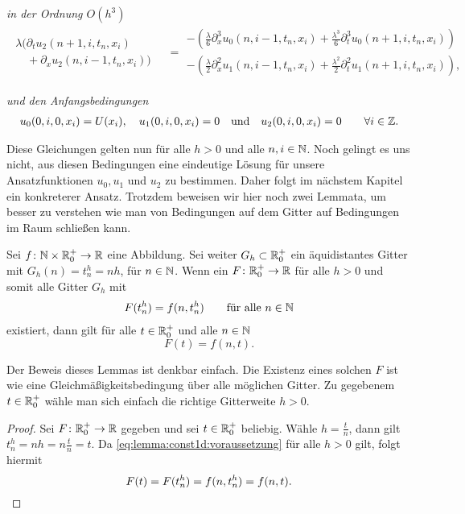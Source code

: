 \noindent \emph{in der Ordnung $O(h^3)$}
\begin{align}\label{eq:transport:diskret:oh3}
\begin{split}
\lambda \bigl(\partial_t u_2(n+1, i, t_n, x_i)\qquad\\
\quad + \partial_x u_2(n, i-1, t_n, x_i) \bigr)
\end{split}
&= \begin{split}
- \left(\frac {\lambda}{6} \partial^3_x u_0(n, i-1, t_n, x_i) + \frac{\lambda^3}{6} \partial^3_t u_0(n+1, i, t_n, x_i)\right)\\
- \left(\frac {\lambda}{2} \partial^2_x u_1(n, i-1, t_n, x_i) + \frac{\lambda^2}{2} \partial^2_t u_1(n+1, i, t_n, x_i)\right),
\end{split}
\end{align}

\vspace{0.4cm}
\noindent \emph{und den Anfangsbedingungen}
\begin{align}\label{eq:transport:diskret:anfangsbedinungen}
u_0(0, i, 0, x_i) = U(x_i), \quad u_1(0, i, 0, x_i) = 0 \quad \text{und} \quad u_2(0, i, 0, x_i) = 0 \qquad \forall i \in \mathbb Z.
\end{align}

Diese Gleichungen gelten nun für alle $h > 0$ und alle $n, i \in \mathbb N$.
Noch gelingt es uns nicht, aus diesen Bedingungen eine eindeutige Lösung für unsere Ansatzfunktionen $u_0, u_1$ und $u_2$ zu bestimmen.
Daher folgt im nächstem Kapitel ein konkreterer Ansatz.
Trotzdem beweisen wir hier noch zwei Lemmata, um besser zu verstehen wie man von Bedingungen auf dem Gitter auf Bedingungen im Raum schließen kann.
\\

\begin{lemma} \label{lemma:transport:diskret:konstant1}
Sei $f\colon \mathbb N \times \mathbb R^+_0 \to \mathbb R$ eine Abbildung.
Sei weiter $G_h \subset \mathbb R^+_0$ ein äquidistantes Gitter mit $G_h(n) = t^h_n = n h$, für $n \in \mathbb N$.
Wenn ein $F\colon \mathbb R^+_0 \to \mathbb R$ für alle $h > 0$ und somit alle Gitter $G_h$ mit
\begin{align}\label{eq:lemma:const1d:voraussetzung}
F(t^h_n) = f(n, t^h_n) \qquad \text{für alle $n \in \mathbb N$}
\end{align}
existiert, dann gilt für alle $t \in \mathbb R^+_0$ und alle $n \in \mathbb N$
\[ F(t) = f(n, t). \]
\end{lemma}
Der Beweis dieses Lemmas ist denkbar einfach. Die Existenz eines solchen $F$ ist wie eine Gleichmäßigkeitsbedingung über alle möglichen Gitter.
Zu gegebenem $t \in \mathbb R^+_0$ wähle man sich einfach die richtige Gitterweite $h > 0$.
\begin{proof}
Sei $F\colon \mathbb R^+_0 \to \mathbb R$ gegeben und sei $t \in \mathbb R^+_0$ beliebig.
Wähle $h = \frac{t}{n}$, dann gilt $t^h_n = nh = n \frac{t}{n} = t$.
Da \eqref{eq:lemma:const1d:voraussetzung} für alle $h > 0$ gilt, folgt hiermit 
\[ F(t) = F(t^h_n) = f(n, t^h_n) = f(n, t). \qedhere \]
\end{proof}

